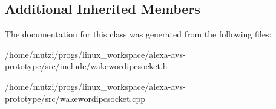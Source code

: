 \subsection*{Additional Inherited Members}


The documentation for this class was generated from the following files\+:\begin{DoxyCompactItemize}
\item 
/home/mutzi/progs/linux\+\_\+workspace/alexa-\/avs-\/prototype/src/include/wakewordipcsocket.\+h\item 
/home/mutzi/progs/linux\+\_\+workspace/alexa-\/avs-\/prototype/src/wakewordipcsocket.\+cpp\end{DoxyCompactItemize}
